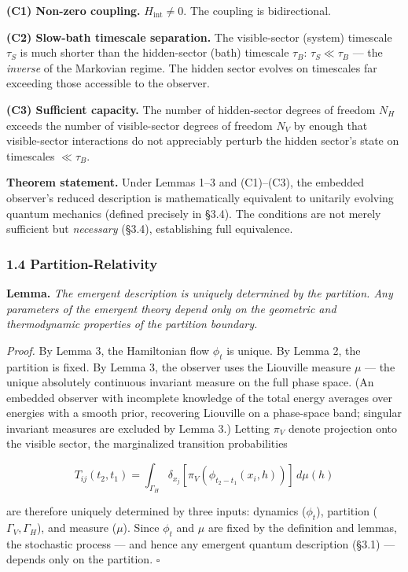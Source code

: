 \documentclass[
]{article}
\begin{document}
\textbf{(C1) Non-zero coupling.} \(H_{\text{int}} \neq 0\). The coupling
is bidirectional.

\textbf{(C2) Slow-bath timescale separation.} The visible-sector
(system) timescale \(\tau_S\) is much shorter than the hidden-sector
(bath) timescale \(\tau_B\): \(\tau_S \ll \tau_B\) --- the
\emph{inverse} of the Markovian regime. The hidden sector evolves on
timescales far exceeding those accessible to the observer.

\textbf{(C3) Sufficient capacity.} The number of hidden-sector degrees
of freedom \(N_H\) exceeds the number of visible-sector degrees of
freedom \(N_V\) by enough that visible-sector interactions do not
appreciably perturb the hidden sector's state on timescales
\(\ll \tau_B\).

\textbf{Theorem statement.} Under Lemmas 1--3 and (C1)--(C3), the
embedded observer's reduced description is mathematically equivalent to
unitarily evolving quantum mechanics (defined precisely in §3.4). The
conditions are not merely sufficient but \emph{necessary} (§3.4),
establishing full equivalence.

\hypertarget{partition-relativity}{%
\subsubsection{1.4 Partition-Relativity}\label{partition-relativity}}

\textbf{Lemma.} \emph{The emergent description is uniquely determined by
the partition. Any parameters of the emergent theory depend only on the
geometric and thermodynamic properties of the partition boundary.}

\emph{Proof.} By Lemma 3, the Hamiltonian flow \(\phi_t\) is unique. By
Lemma 2, the partition is fixed. By Lemma 3, the observer uses the
Liouville measure \(\mu\) --- the unique absolutely continuous invariant
measure on the full phase space. (An embedded observer with incomplete
knowledge of the total energy averages over energies with a smooth
prior, recovering Liouville on a phase-space band; singular invariant
measures are excluded by Lemma 3.) Letting \(\pi_V\) denote projection
onto the visible sector, the marginalized transition probabilities

\[T_{ij}(t_2, t_1) = \int_{\Gamma_H} \delta_{x_j}[\pi_V(\phi_{t_2-t_1}(x_i, h))] \, d\mu(h)\]

are therefore uniquely determined by three inputs: dynamics
(\(\phi_t\)), partition (\(\Gamma_V, \Gamma_H\)), and measure (\(\mu\)).
Since \(\phi_t\) and \(\mu\) are fixed by the definition and lemmas, the
stochastic process --- and hence any emergent quantum description (§3.1)
--- depends only on the partition. \(\square\)
\end{document}
